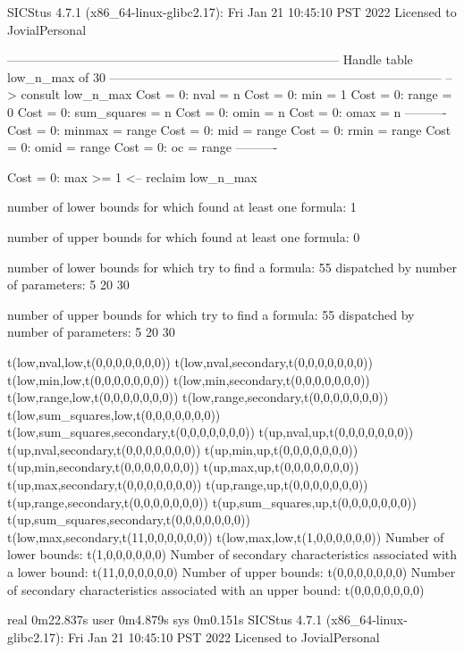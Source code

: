 SICStus 4.7.1 (x86_64-linux-glibc2.17): Fri Jan 21 10:45:10 PST 2022
Licensed to JovialPersonal


--------------------------------------------------------------------------------
Handle table low_n_max of 30
--------------------------------------------------------------------------------
--> consult low_n_max
Cost =  0:  nval        = n
Cost =  0:  min         = 1
Cost =  0:  range       = 0
Cost =  0:  sum_squares = n
Cost =  0:  omin        = n
Cost =  0:  omax        = n
----------
Cost =  0:  minmax      = range
Cost =  0:  mid         = range
Cost =  0:  rmin        = range
Cost =  0:  omid        = range
Cost =  0:  oc          = range
----------

Cost =  0:  max >= 1
<-- reclaim low_n_max

number of lower bounds for which found at least one formula: 1

number of upper bounds for which found at least one formula: 0

number of lower bounds for which try to find a formula: 55
dispatched by number of parameters: 5  20  30

number of upper bounds for which try to find a formula: 55
dispatched by number of parameters: 5  20  30

t(low,nval,low,t(0,0,0,0,0,0,0))
t(low,nval,secondary,t(0,0,0,0,0,0,0))
t(low,min,low,t(0,0,0,0,0,0,0))
t(low,min,secondary,t(0,0,0,0,0,0,0))
t(low,range,low,t(0,0,0,0,0,0,0))
t(low,range,secondary,t(0,0,0,0,0,0,0))
t(low,sum_squares,low,t(0,0,0,0,0,0,0))
t(low,sum_squares,secondary,t(0,0,0,0,0,0,0))
t(up,nval,up,t(0,0,0,0,0,0,0))
t(up,nval,secondary,t(0,0,0,0,0,0,0))
t(up,min,up,t(0,0,0,0,0,0,0))
t(up,min,secondary,t(0,0,0,0,0,0,0))
t(up,max,up,t(0,0,0,0,0,0,0))
t(up,max,secondary,t(0,0,0,0,0,0,0))
t(up,range,up,t(0,0,0,0,0,0,0))
t(up,range,secondary,t(0,0,0,0,0,0,0))
t(up,sum_squares,up,t(0,0,0,0,0,0,0))
t(up,sum_squares,secondary,t(0,0,0,0,0,0,0))
t(low,max,secondary,t(11,0,0,0,0,0,0))
t(low,max,low,t(1,0,0,0,0,0,0))
Number of lower bounds:                                             t(1,0,0,0,0,0,0)
Number of secondary characteristics associated with a lower bound:  t(11,0,0,0,0,0,0)
Number of upper bounds:                                             t(0,0,0,0,0,0,0)
Number of secondary characteristics associated with an upper bound: t(0,0,0,0,0,0,0)

real	0m22.837s
user	0m4.879s
sys	0m0.151s
SICStus 4.7.1 (x86_64-linux-glibc2.17): Fri Jan 21 10:45:10 PST 2022
Licensed to JovialPersonal


